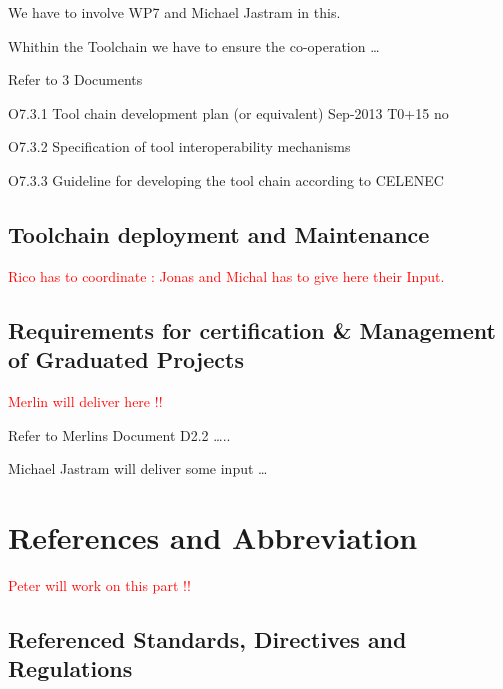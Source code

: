 \documentclass{template/openetcs_article}
\begin{document}
We have to involve WP7 and Michael Jastram in this.

Whithin the Toolchain we have to ensure the co-operation {\dots} 

Refer to 3 Documents

O7.3.1 Tool chain development plan (or equivalent) Sep-2013 T0+15 no

O7.3.2 Specification of tool interoperability mechanisms

O7.3.3 Guideline for developing the tool chain according to CELENEC



\subsection[Toolchain deployment and Maintenance]{Toolchain deployment and Maintenance}
\textcolor{red}{Rico has to coordinate : Jonas and Michal has to give here their Input.}


\subsection{Requirements for certification \& Management of Graduated Projects}
\textcolor{red}{Merlin will deliver here !!}

Refer to Merlins Document D2.2 {\dots}..

Michael Jastram will deliver some input {\dots}


\section{References and Abbreviation}
\textcolor{red}{Peter will work on this part !!}

\subsection{Referenced Standards, Directives and Regulations}
\end{document}
